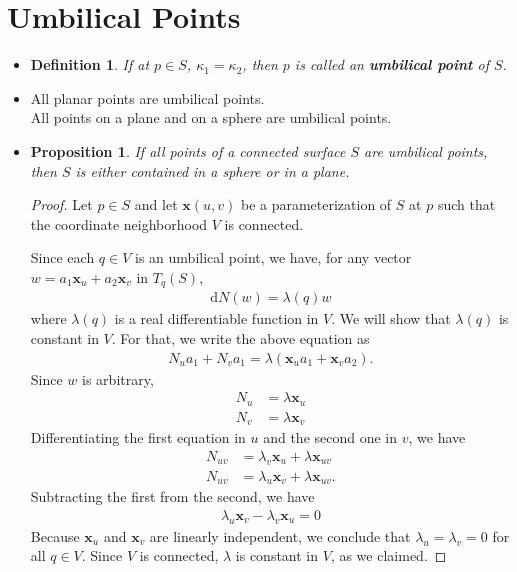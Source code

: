 \documentclass[10pt]{article}
\newtheorem{definition}[lemma]{Definition}
\newtheorem{proposition}[lemma]{Proposition}
\newcommand{\dee}{\mathrm{d}}
\newcommand{\ve}[1]{\mathbf{#1}}
\begin{document}
  \section{Umbilical Points}

  \begin{itemize}
    \item \begin{definition}
      If at $p \in S$, $\kappa_1 = \kappa_2$, then $p$ is called an {\bf umbilical point} of $S$.
    \end{definition}

    \item All planar points are umbilical points.\\
    All points on a plane and on a sphere are umbilical points.

    \item \begin{proposition}
      If all points of a connected surface $S$ are umbilical points, then $S$ is either contained in a sphere or in a plane.
    \end{proposition}

    \begin{proof}
      Let $p \in S$ and let $\ve{x}(u,v)$ be a parameterization of $S$ at $p$ such that the coordinate neighborhood $V$ is connected.

      Since each $q \in V$ is an umbilical point, we have, for any vector $w = a_1 \ve{x}_u + a_2 \ve{x}_v$ in $T_q(S)$,
      \begin{align*}
        \dee N(w) = \lambda(q)w
      \end{align*}
      where $\lambda(q)$ is a real differentiable function in $V$. We will show that $\lambda(q)$ is constant in $V$. For that, we write the above equation as
      \begin{align*}
        N_u a_1 + N_v a_1 = \lambda(\ve{x}_u a_1 + \ve{x}_v a_2).
      \end{align*}
      Since $w$ is arbitrary,
      \begin{align*}
        N_u &= \lambda \ve{x}_u\\
        N_v &= \lambda \ve{x}_v
      \end{align*}
      Differentiating the first equation in $u$ and the second one in $v$, we have
      \begin{align*}
        N_{uv} &= \lambda_v \ve{x}_u + \lambda \ve{x}_{uv}\\
        N_{uv} &= \lambda_u \ve{x}_v + \lambda \ve{x}_{uv}.
      \end{align*}
      Subtracting the first from the second, we have
      \begin{align*}
        \lambda_u \ve{x}_v - \lambda_v \ve{x}_u = 0
      \end{align*}
      Because $\ve{x}_u$ and $\ve{x}_v$ are linearly independent, we conclude that $\lambda_u = \lambda_v = 0$ for all $q \in V$. Since $V$ is connected, $\lambda$ is constant in $V$, as we claimed.


\end{proof}
\end{itemize}
\end{document}
